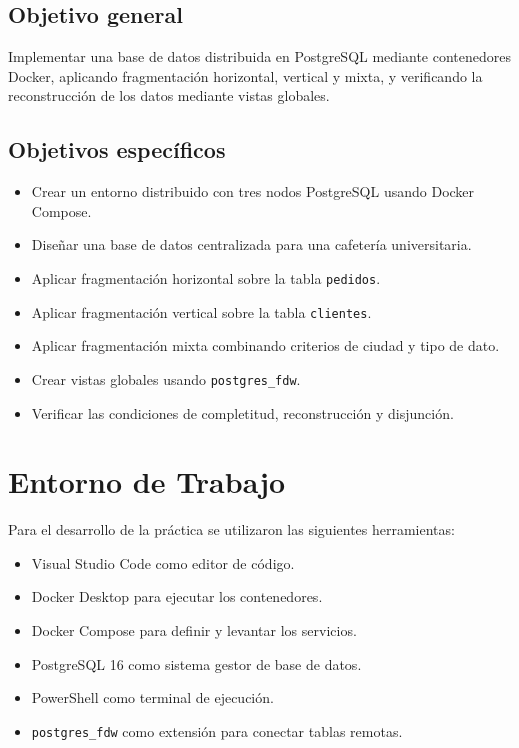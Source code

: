 \documentclass[conference]{IEEEtran}
\begin{document}
\subsection{Objetivo general}
Implementar una base de datos distribuida en PostgreSQL mediante contenedores Docker, aplicando fragmentación horizontal, vertical y mixta, y verificando la reconstrucción de los datos mediante vistas globales.

\subsection{Objetivos específicos}
\begin{itemize}
    \item Crear un entorno distribuido con tres nodos PostgreSQL usando Docker Compose.
    \item Diseñar una base de datos centralizada para una cafetería universitaria.
    \item Aplicar fragmentación horizontal sobre la tabla \texttt{pedidos}.
    \item Aplicar fragmentación vertical sobre la tabla \texttt{clientes}.
    \item Aplicar fragmentación mixta combinando criterios de ciudad y tipo de dato.
    \item Crear vistas globales usando \texttt{postgres\_fdw}.
    \item Verificar las condiciones de completitud, reconstrucción y disjunción.
\end{itemize}

\section{Entorno de Trabajo}
Para el desarrollo de la práctica se utilizaron las siguientes herramientas:
\begin{itemize}
    \item Visual Studio Code como editor de código.
    \item Docker Desktop para ejecutar los contenedores.
    \item Docker Compose para definir y levantar los servicios.
    \item PostgreSQL 16 como sistema gestor de base de datos.
    \item PowerShell como terminal de ejecución.
    \item \texttt{postgres\_fdw} como extensión para conectar tablas remotas.
\end{itemize}
\end{document}
